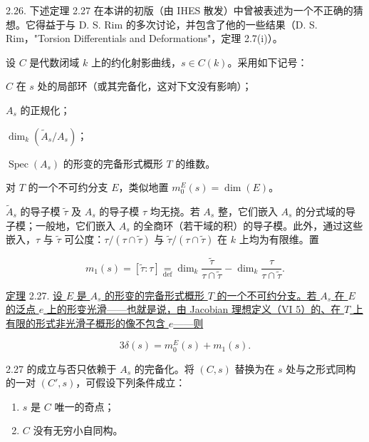 2.26. 下述定理 2.27 在本讲的初版（由 IHES 散发）中曾被表述为一个不正确的猜想。它得益于与 D. S. Rim 的多次讨论，并包含了他的一些结果（D. S. Rim，"Torsion Differentials and Deformations"，定理 2.7(i)）。


设 $C$ 是代数闭域 $k$ 上的约化射影曲线，$s\in C(k)$。采用如下记号：

\begin{description}[leftmargin=2.7cm,style=nextline]
\item[$A_s$] $C$ 在 $s$ 处的局部环（或其完备化，这对下文没有影响）；
\item[$\widetilde A_s$] $A_s$ 的正规化；
\item[$\delta(s)$] $\dim_k(\widetilde A_s/A_s)$；
\item[$m_0(s)$] $\operatorname{Spec}(A_s)$ 的形变的完备形式概形 $T$ 的维数。
\end{description}

对 $T$ 的一个不可约分支 $E$，类似地置 $m_0^E(s)=\dim(E)$。

$\widetilde A_s$ 的导子模 $\widetilde\tau$ 及 $A_s$ 的导子模 $\tau$ 均无挠。若 $A_s$ 整，它们嵌入 $A_s$ 的分式域的导子模；一般地，它们嵌入 $A_s$ 的全商环（若干域的积）的导子模。此外，通过这些嵌入，$\tau$ 与 $\widetilde\tau$ 可公度：$\tau/(\tau\cap\widetilde\tau)$ 与 $\widetilde\tau/(\tau\cap\widetilde\tau)$ 在 $k$ 上均为有限维。置

\begin{equation*}
m_1(s)=[\widetilde\tau:\tau]
\mathrel{\mathop=\limits_{\mathrm{def}}}
\dim_k\frac{\widetilde\tau}{\tau\cap\widetilde\tau}
-\dim_k\frac{\tau}{\tau\cap\widetilde\tau}.
\end{equation*}

\underline{定理} 2.27. \underline{设 $E$ 是 $A_s$ 的形变的完备形式概形 $T$ 的一个不可约分支。若 $A_s$ 在 $E$ 的泛点 $e$ 上的形变光滑——也就是说，由 Jacobian 理想定义（VI 5）的、在 $T$ 上有限的形式非光滑子概形的像不包含 $e$——则}

\begin{equation*}
3\delta(s)=m_0^E(s)+m_1(s).
\end{equation*}


2.27 的成立与否只依赖于 $A_s$ 的完备化。将 $(C,s)$ 替换为在 $s$ 处与之形式同构的一对 $(C',s)$，可假设下列条件成立：

\begin{enumerate}[label=(\alph*),leftmargin=1.2cm]
\item $s$ 是 $C$ 唯一的奇点；
\item $C$ 没有无穷小自同构。
\end{enumerate}

